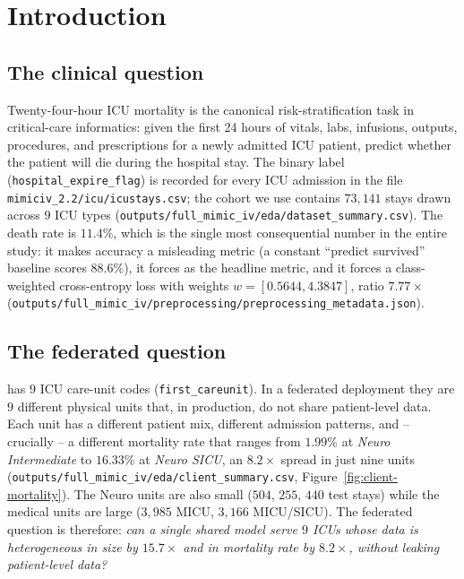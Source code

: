 \section{Introduction}
\label{sec:intro}

\subsection{The clinical question}
Twenty-four-hour ICU mortality is the canonical risk-stratification task in
critical-care informatics: given the first 24 hours of vitals, labs, infusions,
outputs, procedures, and prescriptions for a newly admitted ICU patient, predict
whether the patient will die during the hospital stay. The binary label
(\texttt{hospital\_expire\_flag}) is recorded for every \mimic{} ICU admission
in the file \texttt{mimiciv\_2.2/icu/icustays.csv}; the cohort we use contains
$73{,}141$ stays drawn across $9$ ICU types
(\texttt{outputs/full\_mimic\_iv/eda/dataset\_summary.csv}). The death rate is
$11.4\%$, which is the single most consequential number in the entire study:
it makes accuracy a misleading metric (a constant ``predict survived'' baseline
scores $88.6\%$), it forces \auprc{} as the headline metric, and it forces a
class-weighted cross-entropy loss with weights
$w = [0.5644, 4.3847]$, ratio $7.77\!\times$
(\texttt{outputs/full\_mimic\_iv/preprocessing/preprocessing\_metadata.json}).

\subsection{The federated question}
\mimic{} has $9$ ICU care-unit codes (\texttt{first\_careunit}). In a federated
deployment they are $9$ different physical units that, in production, do not
share patient-level data. Each unit has a different patient mix, different
admission patterns, and -- crucially -- a different mortality rate that ranges
from $1.99\%$ at \emph{Neuro Intermediate} to $16.33\%$ at \emph{Neuro SICU}, an
$8.2\!\times$ spread in just nine units
(\texttt{outputs/full\_mimic\_iv/eda/client\_summary.csv}, Figure~\ref{fig:client-mortality}).
The Neuro units are also small ($504$, $255$, $440$ test stays) while
the medical units are large ($3{,}985$ MICU, $3{,}166$ MICU/SICU). The federated
question is therefore: \textit{can a single shared model serve $9$ ICUs whose
data is heterogeneous in size by $15.7\!\times$ and in mortality rate by $8.2\!\times$,
without leaking patient-level data?}

